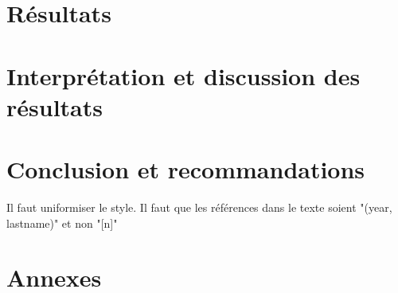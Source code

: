 \documentclass[12pt, letterpaper]{article}
\begin{document}
\section{Résultats}

\section{Interprétation et discussion des résultats}

\section{Conclusion et recommandations}

\clearpage 
\newpage
{
   \color{red}
   \par Il faut uniformiser le style. Il faut que les références dans le texte soient "(year, lastname)" et non "[n]"
}
\printbibliography[title={\bibname\label{bib:references}}] 
\clearpage 
\newpage
\section{Annexes}

\end{document}
